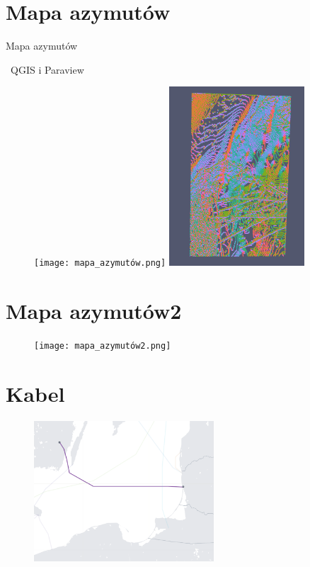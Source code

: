 \documentclass{beamer}
\begin{document}
\section{Mapa azymutów}
\begin{frame}{Mapa azymutów}

		\centering
		\ QGIS i Paraview

	\begin{figure}
		\texttt{[image: mapa\_azymutów.png]}
		\includegraphics[width=0.45\textwidth]{dip_dir_paraview2.png}		
	\end{figure}

\end{frame}

\section{Mapa azymutów2}
\begin{frame}

	\begin{figure}
		\texttt{[image: mapa\_azymutów2.png]}		
	\end{figure}
	
\end{frame}


\section{Kabel}
\begin{frame}
	
	\begin{figure}
		\includegraphics[width=0.6\textwidth]{kanał_bałtyk.png}		
	\end{figure}
	
\end{frame}
\end{document}
